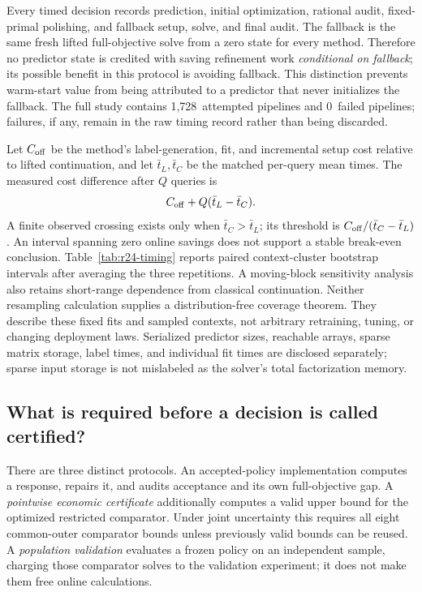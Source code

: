 \documentclass[11pt,letterpaper]{article}
\theoremstyle{definition}
\newcommand{\1}{\mathbf 1}
\newcommand{\RTwentyFourTimingRows}{1,728}
\newcommand{\RTwentyFourTimingFailures}{0}
\begin{document}
Every timed decision records prediction, initial optimization, rational audit,
fixed-primal polishing, and fallback setup, solve, and final audit. The fallback
is the same fresh lifted full-objective solve from a zero state for every
method. Therefore no predictor state is credited with saving refinement work
\emph{conditional on fallback}; its possible benefit in this protocol is
avoiding fallback. This distinction prevents warm-start value from being
attributed to a predictor that never initializes the fallback. The full study
contains \RTwentyFourTimingRows\ attempted pipelines and
\RTwentyFourTimingFailures\ failed pipelines; failures, if any, remain in the
raw timing record rather than being discarded.

Let $C_{\rm off}$ be the method's label-generation, fit, and incremental setup
cost relative to lifted continuation, and let $\bar t_L,\bar t_C$ be the
matched per-query mean times. The measured cost difference after $Q$ queries is
\[
 C_{\rm off}+Q(\bar t_L-\bar t_C).
\]
A finite observed crossing exists only when $\bar t_C>\bar t_L$; its threshold
is $C_{\rm off}/(\bar t_C-\bar t_L)$. An interval spanning zero online savings
does not support a stable break-even conclusion. Table~\ref{tab:r24-timing}
reports paired context-cluster bootstrap intervals after averaging the three
repetitions. A moving-block sensitivity analysis also retains short-range dependence from classical continuation. Neither resampling calculation supplies a distribution-free coverage theorem. They describe these fixed fits and sampled contexts, not
arbitrary retraining, tuning, or changing deployment laws. Serialized predictor
sizes, reachable arrays, sparse matrix storage, label times, and individual fit
times are disclosed separately; sparse input storage is not mislabeled as the
solver's total factorization memory.

\subsection{What is required before a decision is called certified?}
There are three distinct protocols. An accepted-policy implementation computes
a response, repairs it, and audits acceptance and its own full-objective gap.
A \emph{pointwise economic certificate} additionally computes a valid upper
bound for the optimized restricted comparator. Under joint uncertainty this
requires all eight common-outer comparator bounds unless previously valid
bounds can be reused. A \emph{population validation} evaluates a frozen policy
on an independent sample, charging those comparator solves to the validation
experiment; it does not make them free online calculations.
\end{document}
